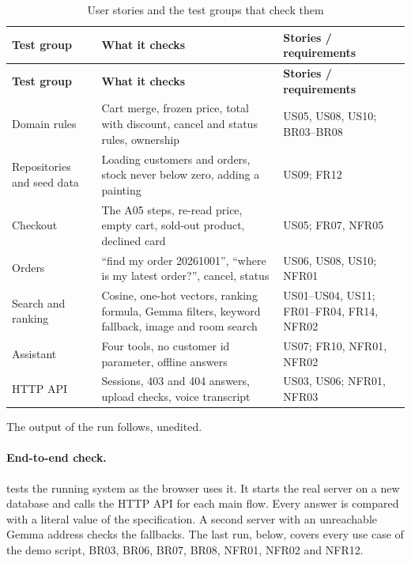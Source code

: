 \begin{longtable}{@{}P{4.4cm}P{6.6cm}P{4.0cm}@{}}
\caption{User stories and the test groups that check them}\label{tab:tests}\\
\toprule
\textbf{Test group} & \textbf{What it checks} & \textbf{Stories / requirements}\\
\midrule
\endfirsthead
\toprule
\textbf{Test group} & \textbf{What it checks} & \textbf{Stories / requirements}\\
\midrule
\endhead
\small Domain rules & \small Cart merge, frozen price, total with discount, cancel and status rules, ownership & \small US05, US08, US10; BR03--BR08\\
\small Repositories and seed data & \small Loading customers and orders, stock never below zero, adding a painting & \small US09; FR12\\
\small Checkout & \small The A05 steps, re-read price, empty cart, sold-out product, declined card & \small US05; FR07, NFR05\\
\small Orders & \small ``find my order 20261001'', ``where is my latest order?'', cancel, status & \small US06, US08, US10; NFR01\\
\small Search and ranking & \small Cosine, one-hot vectors, ranking formula, Gemma filters, keyword fallback, image and room search & \small US01--US04, US11; FR01--FR04, FR14, NFR02\\
\small Assistant & \small Four tools, no customer id parameter, offline answers & \small US07; FR10, NFR01, NFR02\\
\small HTTP API & \small Sessions, 403 and 404 answers, upload checks, voice transcript & \small US03, US06; NFR01, NFR03\\
\bottomrule
\end{longtable}

The output of the run follows, unedited.


\paragraph{End-to-end check.}  tests the running system as the browser uses it. It starts
the real server on a new database and calls the HTTP API for each main flow. Every answer is compared with a literal
value of the specification. A second server with an unreachable Gemma address checks the fallbacks. The last run,
below, covers every use case of the demo script, BR03, BR06, BR07, BR08, NFR01, NFR02 and NFR12.

